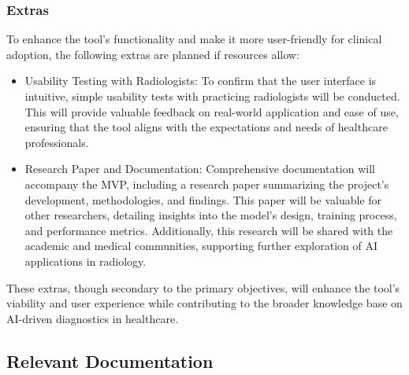 \documentclass[12pt, titlepage]{article}
\begin{document}
\subsubsection{Extras}
To enhance the tool’s functionality and make it more user-friendly for clinical adoption, the following extras are planned if resources allow:
\begin{itemize}
  \item Usability Testing with Radiologists: To confirm that the user interface is intuitive, simple usability tests with practicing radiologists will be conducted. This will provide valuable feedback on real-world application and ease of use, ensuring that the tool aligns with the expectations and needs of healthcare professionals.
  \item Research Paper and Documentation: Comprehensive documentation will accompany the MVP, including a research paper summarizing the project’s development, methodologies, and findings. This paper will be valuable for other researchers, detailing insights into the model’s design, training process, and performance metrics. Additionally, this research will be shared with the academic and medical communities, supporting further exploration of AI applications in radiology.
\end{itemize}

These extras, though secondary to the primary objectives, will enhance the tool’s viability and user experience while contributing to the broader knowledge base on AI-driven diagnostics in healthcare.

\subsection{Relevant Documentation}
\end{document}
